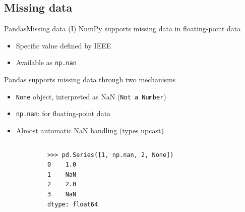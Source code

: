 \documentclass[10pt,compress]{beamer} %
\begin{document}
\subsection{Missing data}

\begin{frame}[fragile]{Pandas}{Missing data (I)}
	NumPy supports missing data in floating-point data
	\begin{itemize}
		\item Specific value defined by IEEE
		\item Available as \texttt{np.nan}
	\end{itemize}
	Pandas supports missing data through two mechanisms
	\begin{itemize}
		\item \texttt{None} object, interpreted as NaN (\texttt{Not a Number})
		\item \texttt{np.nan}: for floating-point data
		\item Almost automatic NaN handling (types upcast)
	\end{itemize}

	\begin{columns}
		\begin{exampleblock}{}
		\vspace{-0.2cm} 
			\begin{lstlisting}
			>>> pd.Series([1, np.nan, 2, None])
			0    1.0
			1    NaN
			2    2.0
			3    NaN
			dtype: float64
			\end{lstlisting}
			\vspace{-0.2cm} 
		\end{exampleblock}
	\end{columns}
\end{frame}
\end{document}
